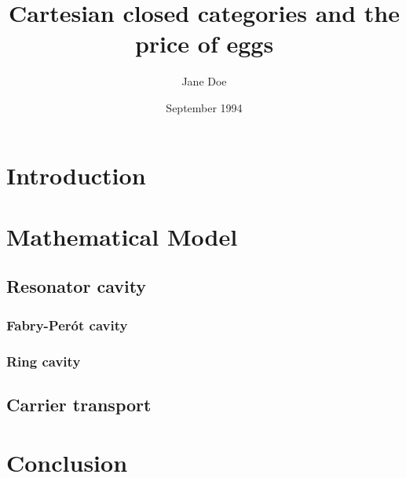 \documentclass{article}
\title{Cartesian closed categories
  and the price of eggs}
\author{Jane Doe}
\date{September 1994}
\begin{document}
\tableofcontents

\section{Introduction}

\section{Mathematical Model}
\subsection{Resonator cavity}
\subsubsection{Fabry-Per\'{o}t cavity}
\subsubsection{Ring cavity}
\subsection{Carrier transport}

\section{Conclusion}
\end{document}
